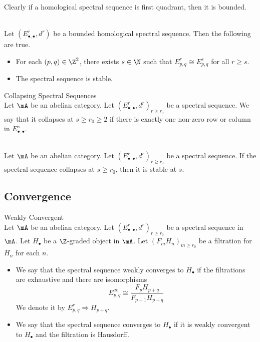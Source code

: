 \documentclass[a4paper]{article}
\begin{document}
Clearly if a homological spectral sequence is first quadrant, then it is bounded. 

\begin{lmm}{}{}\\
Let $(E_{\bullet,\bullet}^r,d^r)$ be a bounded homological spectral sequence. Then the following are true. 
\begin{itemize}
\item For each $(p,q)\in\Z^2$, there exists $s\in\N$ such that $E_{p,q}^r\cong E_{p,q}^s$ for all $r\geq s$. 
\item The spectral sequence is stable. 
\end{itemize}
\end{lmm}

\begin{defn}{Collapsing Spectral Sequences}{}\\
Let $\mA$ be an abelian category. Let $(E_{\bullet,\bullet}^r,d^r)_{r\geq r_0}$ be a spectral sequence. We say that it collapses at $s\geq r_0\geq 2$ if there is exactly one non-zero row or column in $E_{\bullet,\bullet}^s$. 
\end{defn}

\begin{lmm}{}{}\\
Let $\mA$ be an abelian category. Let $(E_{\bullet,\bullet}^r,d^r)_{r\geq r_0}$ be a spectral sequence. If the spectral sequence collapses at $s\geq r_0$, then it is stable at $s$. 
\end{lmm}

\subsection{Convergence}
\begin{defn}{Weakly Convergent}{}\\
Let $\mA$ be an abelian category. Let $(E_{\bullet,\bullet}^r,d^r)_{r\geq r_0}$ be a spectral sequence in $\mA$. Let $H_\bullet$ be a $\Z$-graded object in $\mA$. Let $(F_mH_n)_{m\geq r_0}$ be a filtration for $H_n$ for each $n$. 
\begin{itemize}
\item We say that the spectral sequence weakly converges to $H_\bullet$ if the filtrations are exhaustive and there are isomorphisms $$E_{p,q}^\infty\cong\frac{F_pH_{p+q}}{F_{p-1}H_{p+q}}$$ We denote it by $E_{p,q}^r\Rightarrow H_{p+q}$. 
\item We say that the spectral sequence converges to $H_\bullet$ if it is weakly convergent to $H_\bullet$ and the filtration is Hausdorff. 
\end{itemize}
\end{defn}
\end{document}
